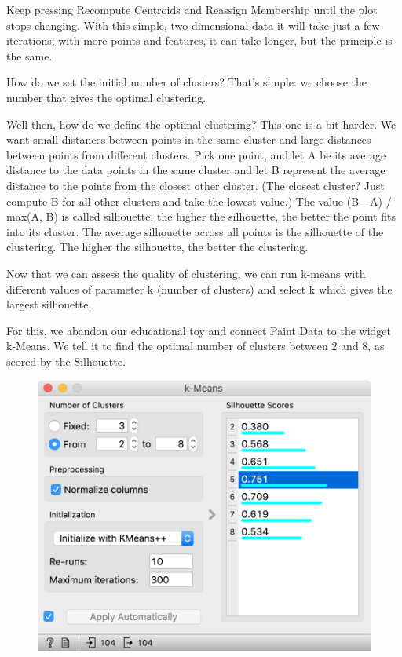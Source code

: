 Keep pressing Recompute Centroids and Reassign Membership until the plot stops changing. With this simple, two-dimensional data it will take just a few iterations; with more points and features, it can take longer, but the principle is the same.

How do we set the initial number of clusters? That's simple: we choose the number that gives the optimal clustering.

Well then, how do we define the optimal clustering? This one is a bit harder. We want small distances between points in the same cluster and large distances between points from different clusters. Pick one point, and let A be its average distance to the data points in the same cluster and let B represent the average distance to the points from the closest other cluster. (The closest cluster? Just compute B for all other clusters and take the lowest value.) The value (B - A) / max(A, B) is called silhouette; the higher the silhouette, the better the point fits into its cluster. The average silhouette across all points is the silhouette of the clustering. The higher the silhouette, the better the clustering.

Now that we can assess the quality of clustering, we can run k-means with different values of parameter k (number of clusters) and select k which gives the largest silhouette.

For this, we abandon our educational toy and connect Paint Data to the widget k-Means. We tell it to find the optimal number of clusters between 2 and 8, as scored by the Silhouette.

\begin{figure}[h]
    \centering
    \includegraphics[width=\linewidth]{kmeans-silhouette.png}
    \caption{$\;$} %
\end{figure}

